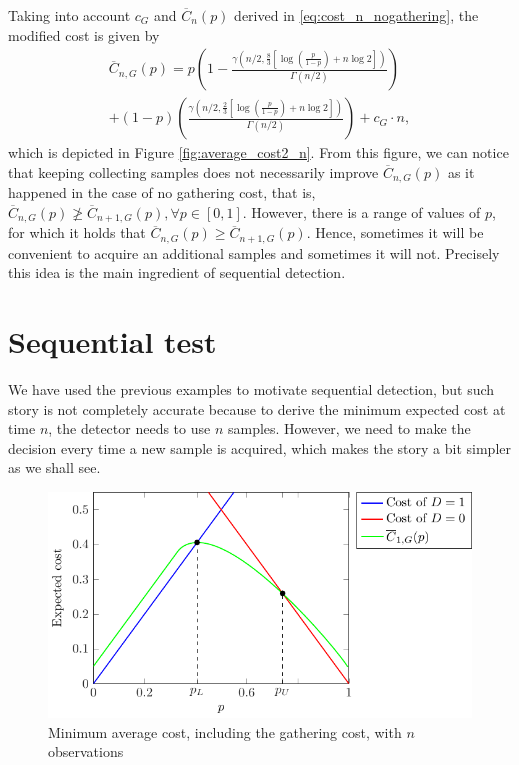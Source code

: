 Taking into account $c_{G}$ and $\overline{C}_n(p)$ derived in \eqref{eq:cost_n_nogathering}, the modified cost is given by
\begin{multline*}
	\overline{C}_{n,G}(p)  = p \left(1 - \frac{\gamma \left(n/2,\frac{8}{3} \left[\log \left(\frac{p}{1 - p}  \right) + n \log 2 \right]\right)}{\Gamma(n/2)}\right) \\ + (1 - p) \left(\frac{\gamma \left(n/2,\frac{2}{3} \left[\log \left(\frac{p}{1 - p}  \right) + n \log 2 \right]\right)}{\Gamma(n/2)}\right) + c_G \cdot n,
\end{multline*}
which is depicted in Figure \ref{fig:average_cost2_n}. From this figure, we can notice that keeping collecting samples does not necessarily improve $\overline{C}_{n,G}(p)$ as it happened in the case of no gathering cost, that is, $\overline{C}_{n,G}(p) \not \geq \overline{C}_{n+1,G}(p), \forall p \in [0,1]$. However, there is a range of values of $p$, for which it holds that $\overline{C}_{n,G}(p) \geq \overline{C}_{n+1,G}(p)$. Hence, sometimes it will be convenient to acquire an additional samples and sometimes it will not. Precisely this idea is the main ingredient of sequential detection.

\section{Sequential test}

We have used the previous examples to motivate sequential detection, but such story is not completely accurate because to derive the minimum expected cost at time $n$, the detector needs to use $n$ samples. However, we need to make the decision every time a new sample is acquired, which makes the story a bit simpler as we shall see.

\begin{figure}[t]
	\begin{center}
		\includegraphics{Figures/Expected_Cost3}
	\end{center}
	\caption{Minimum average cost, including the gathering cost, with $n$ observations}
	\label{fig:average_cost3_n}
\end{figure}

